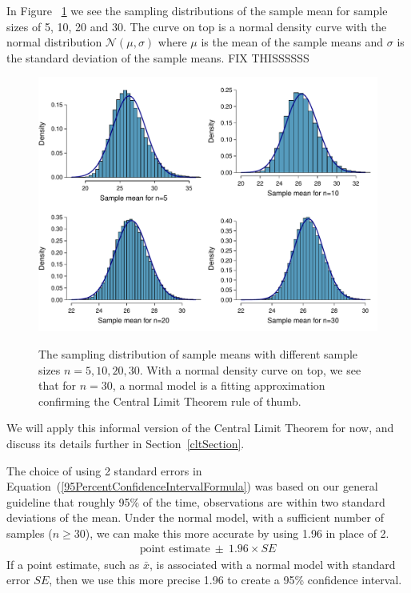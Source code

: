 In Figure ~\ref{cltThirty} we see the sampling distributions of the sample mean for sample sizes of 5, 10, 20 and 30. The curve on top is a normal density curve with the normal distribution $\mathcal{N}(\mu, \sigma)$ where $\mu$ is the mean of the sample means and $\sigma$ is the standard deviation of the sample means.
FIX THISSSSSS
\begin{figure}[hht] 
   \centering
   \includegraphics[width=\textwidth]{ch_inference_foundations_oi_biostat/figures/clt30/clt30}
     \label{cltThirty}
   \caption{The sampling distribution of sample means with different sample sizes $n=5, 10, 20, 30$. With a normal density curve on top, we see that for $n=30$, a normal model is a fitting approximation confirming the Central Limit Theorem rule of thumb.}
\end{figure}

We will apply this informal version of the Central Limit Theorem for now, and discuss its details further in Section~\ref{cltSection}.

The choice of using 2 standard errors in Equation~(\ref{95PercentConfidenceIntervalFormula}) was based on our general guideline that roughly 95\% of the time, observations are within two standard deviations of the mean. Under the normal model, with a sufficient number of samples ($n\geq 30$), we can make this more accurate by using 1.96 in place of  2.
\begin{eqnarray}
\text{point estimate}\ \pm\ 1.96\times SE
\label{95PercentCIWhenUsingNormalModel}
\end{eqnarray}
If a point estimate, such as $\bar{x}$, is associated with a normal model with standard error $SE$, then we use this more precise 1.96 to create a  95\% confidence interval. 

